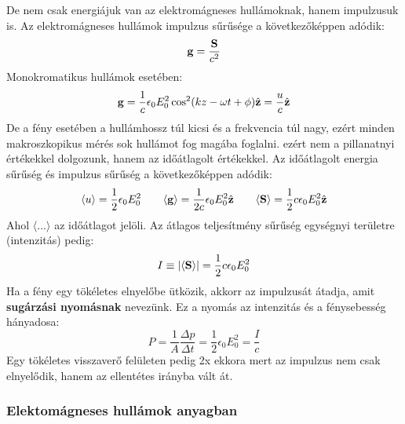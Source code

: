 \documentclass[a4paper,12pt]{article}
\begin{document}
De nem csak energiájuk van az elektromágneses hullámoknak, hanem impulzusuk is. Az elektromágneses hullámok impulzus sűrűsége a következőképpen adódik:
\begin{equation}
    \bold{g} = \frac{\bold{S}}{c^2}
\end{equation}
Monokromatikus hullámok esetében:
\begin{equation}
    \bold{g} = \frac{1}{c}\epsilon_0 E_0^2 \cos^2(kz - \omega t + \phi) \hat{\bold{z}} = \frac{u}{c} \hat{\bold{z}}
\end{equation}
De a fény esetében a hullámhossz túl kicsi és a frekvencia túl nagy, ezért minden makroszkopikus mérés sok hullámot fog magába foglalni. ezért nem a pillanatnyi értékekkel dolgozunk,
hanem az időátlagolt értékekkel. Az időátlagolt energia sűrűség és impulzus sűrűség a következőképpen adódik:
\begin{equation}
    \langle u \rangle = \frac{1}{2} \epsilon_0 E_0^2 \qquad \langle \bold{g} \rangle = \frac{1}{2c} \epsilon_0 E_0^2 \hat{\bold{z}} \qquad \langle \bold{S} \rangle = \frac{1}{2} c \epsilon_0 E_0^2 \hat{\bold{z}}
\end{equation}
Ahol $\langle ... \rangle$ az időátlagot jelöli. Az átlagos teljesítmény sűrűség egységnyi területre (intenzitás) pedig:
\begin{equation}
    I \equiv |\langle \bold{S} \rangle| = \frac{1}{2} c \epsilon_0 E_0^2
\end{equation}
Ha a fény egy tökéletes elnyelőbe ütközik, akkorr az impulzusát átadja, amit \textbf{sugárzási nyomásnak} nevezünk. Ez a nyomás az intenzitás és a fénysebesség hányadosa:
\begin{equation}
    P = \frac{1}{A} \frac{\Delta p}{\Delta t} = \frac{1}{2} \epsilon_0 E_0^2 =\frac{I}{c}
\end{equation}
Egy tökéletes visszaverő felületen pedig 2x ekkora mert az impulzus nem csak elnyelődik, hanem az ellentétes irányba vált át.

\subsubsection{Elektomágneses hullámok anyagban}
\end{document}

